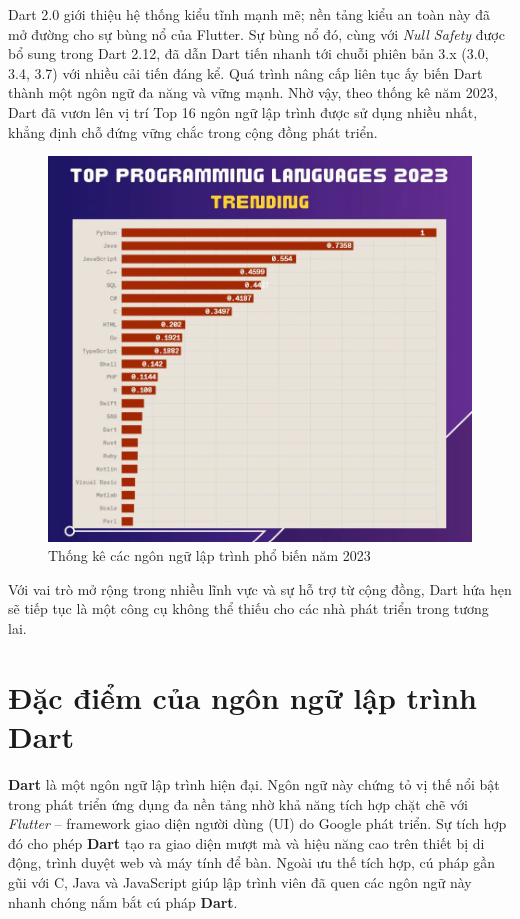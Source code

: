 \documentclass[../DoAn.tex]{subfiles}
\numberwithin{figure}{chapter}
\begin{document}
Dart 2.0 giới thiệu hệ thống kiểu tĩnh mạnh mẽ; nền tảng kiểu an toàn này đã mở đường cho sự bùng nổ của Flutter. Sự bùng nổ đó, cùng với \textit{Null Safety} được bổ sung trong Dart 2.12, đã dẫn Dart tiến nhanh tới chuỗi phiên bản 3.x (3.0, 3.4, 3.7) với nhiều cải tiến đáng kể. Quá trình nâng cấp liên tục ấy biến Dart thành một ngôn ngữ đa năng và vững mạnh. Nhờ vậy, theo thống kê năm 2023, Dart đã vươn lên vị trí Top 16 ngôn ngữ lập trình được sử dụng nhiều nhất, khẳng định chỗ đứng vững chắc trong cộng đồng phát triển.


\begin{figure}[H]
    \centering
    \includegraphics[width=1\textwidth]{Hinhve/ranking.png}
    \caption{Thống kê các ngôn ngữ lập trình phổ biến năm 2023}
    \label{fig:dart_platforms}
\end{figure}

Với vai trò mở rộng trong nhiều lĩnh vực và sự hỗ trợ từ cộng đồng, Dart hứa hẹn sẽ tiếp tục là một công cụ không thể thiếu cho các nhà phát triển trong tương lai.

\section{Đặc điểm của ngôn ngữ lập trình Dart}

\textbf{Dart} là một ngôn ngữ lập trình hiện đại. Ngôn ngữ này chứng tỏ vị thế nổi bật trong phát triển ứng dụng đa nền tảng nhờ khả năng tích hợp chặt chẽ với \emph{Flutter} – framework giao diện người dùng (UI) do Google phát triển. Sự tích hợp đó cho phép \textbf{Dart} tạo ra giao diện mượt mà và hiệu năng cao trên thiết bị di động, trình duyệt web và máy tính để bàn. Ngoài ưu thế tích hợp, cú pháp gần gũi với C, Java và JavaScript giúp lập trình viên đã quen các ngôn ngữ này nhanh chóng nắm bắt cú pháp \textbf{Dart}.
\end{document}
